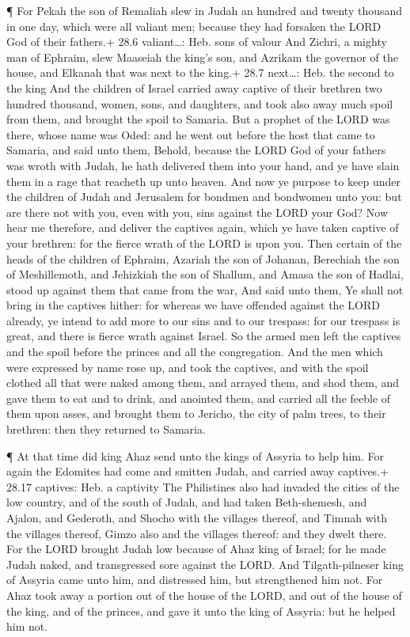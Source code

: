  ¶ For Pekah the son of Remaliah slew in Judah an hundred
and twenty thousand in one day, which were all valiant men; because they
had forsaken the LORD God of their fathers.+ 28.6 valiant\ldots: Heb.
sons of valour  And Zichri, a mighty man of Ephraim, slew
Maaseiah the king's son, and Azrikam the governor of the house, and
Elkanah that was next to the king.+ 28.7 next\ldots: Heb. the second to
the king  And the children of Israel carried away captive of
their brethren two hundred thousand, women, sons, and daughters, and
took also away much spoil from them, and brought the spoil to Samaria.
 But a prophet of the LORD was there, whose name was Oded:
and he went out before the host that came to Samaria, and said unto
them, Behold, because the LORD God of your fathers was wroth with Judah,
he hath delivered them into your hand, and ye have slain them in a rage
that reacheth up unto heaven.  And now ye purpose to keep
under the children of Judah and Jerusalem for bondmen and bondwomen unto
you: but are there not with you, even with you, sins against the LORD
your God?  Now hear me therefore, and deliver the captives
again, which ye have taken captive of your brethren: for the fierce
wrath of the LORD is upon you.  Then certain of the heads
of the children of Ephraim, Azariah the son of Johanan, Berechiah the
son of Meshillemoth, and Jehizkiah the son of Shallum, and Amasa the son
of Hadlai, stood up against them that came from the war, 
And said unto them, Ye shall not bring in the captives hither: for
whereas we have offended against the LORD already, ye intend to add more
to our sins and to our trespass: for our trespass is great, and there is
fierce wrath against Israel.  So the armed men left the
captives and the spoil before the princes and all the congregation.
 And the men which were expressed by name rose up, and took
the captives, and with the spoil clothed all that were naked among them,
and arrayed them, and shod them, and gave them to eat and to drink, and
anointed them, and carried all the feeble of them upon asses, and
brought them to Jericho, the city of palm trees, to their brethren: then
they returned to Samaria.

 ¶ At that time did king Ahaz send unto the kings of
Assyria to help him.  For again the Edomites had come and
smitten Judah, and carried away captives.+ 28.17 captives: Heb. a
captivity  The Philistines also had invaded the cities of
the low country, and of the south of Judah, and had taken Beth-shemesh,
and Ajalon, and Gederoth, and Shocho with the villages thereof, and
Timnah with the villages thereof, Gimzo also and the villages thereof:
and they dwelt there.  For the LORD brought Judah low
because of Ahaz king of Israel; for he made Judah naked, and
transgressed sore against the LORD.  And Tilgath-pilneser
king of Assyria came unto him, and distressed him, but strengthened him
not.  For Ahaz took away a portion out of the house of the
LORD, and out of the house of the king, and of the princes, and gave it
unto the king of Assyria: but he helped him not.


